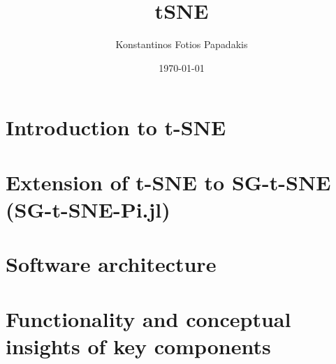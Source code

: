 \documentclass{article}
\begin{document}
\title{tSNE}
\author{Konstantinos Fotios Papadakis}
\date{\today}

\maketitle

\section{Introduction to t-SNE}


\section{Extension of t-SNE to SG-t-SNE (SG-t-SNE-Pi.jl)}
%

\section{Software architecture}


\section{Functionality and conceptual insights of key components}
\end{document}
